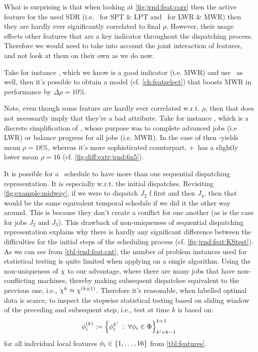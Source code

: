 What is surprising is that when looking at \cref{fig:jrnd:feat:corr} then the 
active feature for the used SDR (i.e. \phiproc\ for SPT \& LPT and \phijobWrm\ 
for LWR  \& MWR) then they are hardly ever significantly correlated to final 
$\rho$.
However, their usage effects other features that are a key indicator throughout 
the dispatching process. Therefore we would need to take into account the joint 
interaction of features, and not look at them on their own as we do now. 

Take for instance \phijobWrm, which we know is a good indicator (i.e. MWR) and 
use \phiendTime\ as well, then it's possible to obtain a model (cf. 
\cref{ch:featselect}) that boosts MWR in performance by $\Delta\rho=10\%$.

Note, even though some feature are hardly ever correlated w.r.t. $\rho$, then 
that does not necessarily imply that they're a bad attribute.
Take for instance \phijobOps, which is a discrete simplification of 
\phijobWrm, whose purpose was to complete advanced jobs (i.e LWR) or 
balance progress for all jobs (i.e. MWR). 
In the case of  then -\phijobOps yields mean $\rho=18\%$, whereas 
it's more sophisticated counterpart, +\phijobWrm\ has a slightly lower mean 
$\rho=16$ (cf. \cref{fig:diff:extr:jrnd:6x5}).

It is possible for a \JSP\ schedule to have more than one sequential 
dispatching representation. It is especially w.r.t. the initial dispatches. 
Revisiting \cref{fig:example:midway}, if we were to dispatch $J_2$ f
first and then $J_4$, then that would be the same equivalent
temporal schedule if we did it the other way around. 
This is because they don't create a conflict for one another 
(as is the case for jobs $J_2$ and $J_3$). 
This drawback of non-uniqueness of sequential dispatching representation 
explains why there is hardly any significant difference between the 
difficulties for the initial steps of the scheduling process (cf. 
\cref{fig:jrnd:feat:KStest}).
As we can see from \cref{tbl:jrnd:feat:cnt}, the number of problem instances 
used for statistical testing is quite limited when applying on a single 
algorithm. 
Using the non-uniqueness of ${\mathbf{\chi}}$ to our advantage, where there are many jobs 
that have non-conflicting machines, thereby making subsequent dispatches 
equivalent to the previous one, i.e., ${\mathbf{\chi}}^k \approx  {\mathbf{\chi}}^{(k\pm1)}$. 
Therefore it's reasonable, when labelled optimal data is scarce, to inspect the 
stepwise statistical testing based on sliding window of the preceding and 
subsequent step, i.e., test at time $k$ is based on: 
\begin{equation}
{\mathbf{\phi}}_i^{(k)} := \left\{\phi_i^{k'}\;:\;\forall \phi_i\in\Phi\right\}_{k'=k-1}^{k+1} 
\end{equation}
for all individual local features $\phi_i\in\{1,\ldots,16\}$ from 
\cref{tbl:features}.

